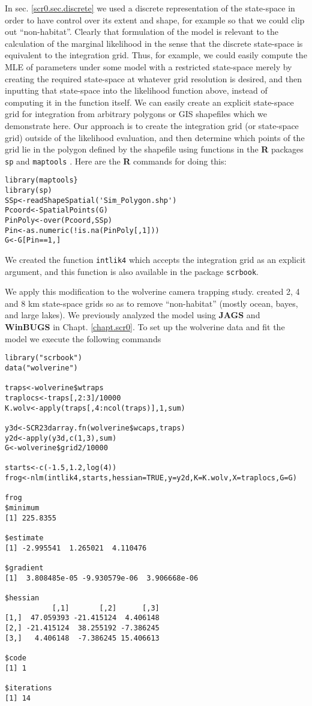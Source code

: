 In sec. \ref{scr0.sec.discrete} 
 we used a discrete representation of
the state-space in order to have control over its extent and shape,
for example so that we could clip out ``non-habitat''. Clearly that
formulation of the model is relevant to the calculation of the
marginal 
likelihood in the sense that the discrete state-space 
is equivalent to the integration grid.
Thus, for example, we could
easily compute the MLE of parameters under some model with a
restricted state-space merely by creating the required state-space at
whatever grid resolution is desired, and then inputting that state-space
into the likelihood function above, instead of computing it in the
function itself. We can easily create an explicit
state-space grid for integration from arbitrary polygons or GIS
shapefiles  which we 
demonstrate here. Our approach is to create the integration grid
(or state-space grid) outside of the likelihood evaluation, and then
determine which points of the grid lie in the polygon defined by the
shapefile using 
functions in the {\bf R} packages \mbox{\tt sp}  and
\mbox{\tt maptools}  .  Here
are the {\bf R} commands for doing this:  
{\small
\begin{verbatim}
library(maptools}
library(sp)
SSp<-readShapeSpatial('Sim_Polygon.shp')
Pcoord<-SpatialPoints(G)
PinPoly<-over(Pcoord,SSp)
Pin<-as.numeric(!is.na(PinPoly[,1]))
G<-G[Pin==1,]
\end{verbatim}
}
We created  the function \mbox{\tt intlik4} which accepts the integration
grid as an explicit argument, and this function is also available in
the package  \mbox{\tt scrbook}.

We apply this modification to the wolverine camera trapping
study. \citet{royle_etal:2011jwm} created 2, 4 and 8 km state-space
grids so as to remove ``non-habitat'' (mostly ocean, bayes, and large
lakes). We previously analyzed the model using {\bf JAGS} and {\bf WinBUGS} in
Chapt. \ref{chapt.scr0}.  To set up the wolverine data and fit the
model we execute the following commands
{\small 
\begin{verbatim}
library("scrbook")
data("wolverine")

traps<-wolverine$wtraps
traplocs<-traps[,2:3]/10000
K.wolv<-apply(traps[,4:ncol(traps)],1,sum)

y3d<-SCR23darray.fn(wolverine$wcaps,traps)
y2d<-apply(y3d,c(1,3),sum)
G<-wolverine$grid2/10000

starts<-c(-1.5,1.2,log(4))
frog<-nlm(intlik4,starts,hessian=TRUE,y=y2d,K=K.wolv,X=traplocs,G=G)

frog
$minimum
[1] 225.8355

$estimate
[1] -2.995541  1.265021  4.110476

$gradient
[1]  3.808485e-05 -9.930579e-06  3.906668e-06

$hessian
           [,1]       [,2]      [,3]
[1,]  47.059393 -21.415124  4.406148
[2,] -21.415124  38.255192 -7.386245
[3,]   4.406148  -7.386245 15.406613

$code
[1] 1

$iterations
[1] 14
\end{verbatim}
}

